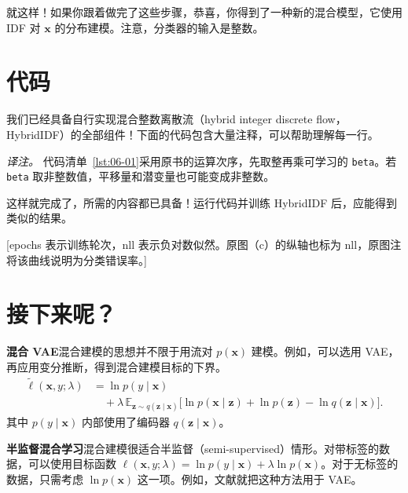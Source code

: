 就这样！如果你跟着做完了这些步骤，恭喜，你得到了一种新的混合模型，它使用 IDF 对 $\mathbf{x}$ 的分布建模。注意，分类器的输入是整数。

\section{代码}

我们已经具备自行实现混合整数离散流（hybrid integer discrete flow，HybridIDF）的全部组件！下面的代码包含大量注释，可以帮助理解每一行。



\emph{译注。} 代码清单~\ref{lst:06-01}采用原书的运算次序，先取整再乘可学习的 \texttt{beta}。若 \texttt{beta} 取非整数值，平移量和潜变量也可能变成非整数。


这样就完成了，所需的内容都已具备！运行代码并训练 HybridIDF 后，应能得到类似的结果。

[epochs 表示训练轮次，nll 表示负对数似然。原图（c）的纵轴也标为 nll，原图注将该曲线说明为分类错误率。]

\section{接下来呢？}

\noindent\textbf{混合 VAE}\quad 混合建模的思想并不限于用流对 $p(\mathbf{x})$ 建模。例如，可以选用 VAE，再应用变分推断，得到混合建模目标的下界。
\begin{equation}
\begin{aligned}
\tilde{\ell}(\mathbf{x},y;\lambda)
&=\ln p(y\mid\mathbf{x})\\
&\quad+\lambda\,\mathbb{E}_{\mathbf{z}\sim q(\mathbf{z}\mid\mathbf{x})}
  \bigl[\ln p(\mathbf{x}\mid\mathbf{z})+\ln p(\mathbf{z})-\ln q(\mathbf{z}\mid\mathbf{x})\bigr].
\end{aligned}
\tag{6.14}\label{eq:06-14}
\end{equation}
其中 $p(y\mid\mathbf{x})$ 内部使用了编码器 $q(\mathbf{z}\mid\mathbf{x})$。

\noindent\textbf{半监督混合学习}\quad 混合建模很适合半监督（semi-supervised）情形。对带标签的数据，可以使用目标函数 $\ell(\mathbf{x},y;\lambda)=\ln p(y\mid\mathbf{x})+\lambda\ln p(\mathbf{x})$。对于无标签的数据，只需考虑 $\ln p(\mathbf{x})$ 这一项。例如，文献就把这种方法用于 VAE。

